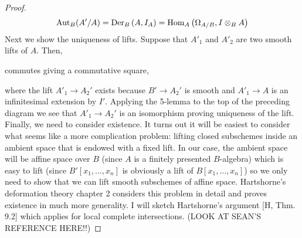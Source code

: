 \documentclass[12pt]{article}
\begin{document}
\begin{proof}
\[ \mathrm{Aut}_B(A'/A) = \Der[B]{A}{I_A} = \Hom{A}{\Omega_{A/B}}{I \otimes_B A} \]
Next we show the uniqueness of lifts. Suppose that $A'_1$ and $A'_2$ are two smooth lifts of $A$. Then,
\begin{center}
\end{center}
commutes giving a commutative square,
\begin{center}
\end{center}
where the lift $A'_1 \to A_2'$ exists because $B' \to A_2'$ is smooth and $A'_1 \to A$ is an infinitesimal extension by $I'$. Applying the 5-lemma to the top of the preceding diagram we see that $A'_1 \to A_2'$ is an isomorphism proving uniqueness of the lift.
\bigskip\\
Finally, we need to consider existence. It turns out it will be easiest to consider what seems like a more complication problem: lifting closed subschemes inside an ambient space that is endowed with a fixed lift. In our case, the ambient space will be affine space over $B$ (since $A$ is a finitely presented $B$-algebra) which is easy to lift (since $B'[x_1, \dots, x_n]$ is obviously a lift of $B[x_1, \dots, x_n]$) so we only need to show that we can lift smooth subschemes of affine space. Hartshorne's deformation theory chapter 2 considers this problem in detail and proves existence in much more generality. I will sketch Hartshorne's argument [H, Thm. 9.2] which applies for local complete intersections. (LOOK AT SEAN'S REFERENCE HERE!!)

\end{proof}
\end{document}
